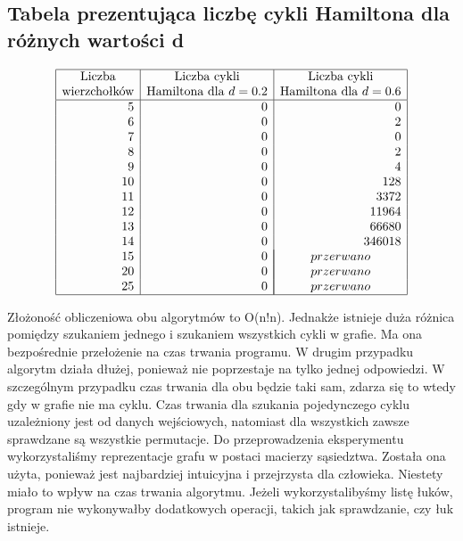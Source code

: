 \documentclass[polish,polish,a4paper]{article}
\begin{document}
\begin{spacing}{1.25}
\begin{spacing}{1.3}
	{\centering \subsection*{Tabela prezentująca liczbę cykli Hamiltona dla różnych wartości d}}
	\begin{equation*}
	\begin{array}{|r|r|r|}
	\hline
	\multicolumn{1}{|c|}{$Liczba$}&
	\multicolumn{1}{c|}{$Liczba cykli$}&
	\multicolumn{1}{c|}{$Liczba cykli$}\\
	\multicolumn{1}{|c|}{$wierzchołków$}&
	\multicolumn{1}{c|}{$Hamiltona dla $ d=0.2}&
	\multicolumn{1}{c|}{$Hamiltona dla $ d=0.6}\\
	\hline
	5&0&0\\
	6&0&2\\
	7&0&0\\
	8&0&2\\
	9&0&4\\
	10&0&128\\
	11&0&3372\\
	12&0&11964\\
	13&0&66680\\
	14&0&346018\\
	15&0&\multicolumn{1}{|c|}{przerwano}\\
	20&0&\multicolumn{1}{|c|}{przerwano}\\
	25&0&\multicolumn{1}{|c|}{przerwano}\\
	
	\hline
	\end{array}
	\end{equation*}
\end{spacing}
Złożoność obliczeniowa obu algorytmów to O(n!n).
Jednakże istnieje duża różnica pomiędzy szukaniem jednego i szukaniem wszystkich cykli w grafie. Ma ona bezpośrednie przełożenie na czas trwania programu. W drugim przypadku algorytm działa dłużej, ponieważ nie poprzestaje na tylko jednej odpowiedzi. W szczególnym przypadku czas trwania dla obu będzie taki sam, zdarza się to wtedy gdy w grafie nie ma cyklu. Czas trwania dla szukania pojedynczego cyklu uzależniony jest od danych wejściowych, natomiast dla wszystkich zawsze sprawdzane są wszystkie permutacje.
Do przeprowadzenia eksperymentu wykorzystaliśmy reprezentacje grafu w postaci macierzy sąsiedztwa. Została ona użyta, ponieważ jest najbardziej intuicyjna i przejrzysta dla człowieka. Niestety miało to wpływ na czas trwania algorytmu. Jeżeli wykorzystalibyśmy listę łuków, program nie wykonywałby dodatkowych operacji, takich jak sprawdzanie, czy łuk istnieje.


\end{spacing}
\end{document}
